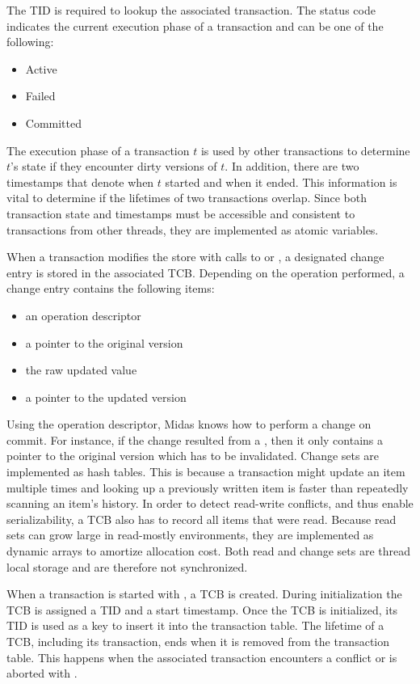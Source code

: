 The TID is required to lookup the associated transaction. The status code indicates the current execution phase of a transaction and can be one of the following:

\begin{itemize}
    \item Active
    \item Failed
    \item Committed
\end{itemize}

The execution phase of a transaction $t$ is used by other transactions to determine $t$'s state if they encounter dirty versions of $t$. In addition, there are two timestamps that denote when $t$ started and when it ended. This information is vital to determine if the lifetimes of two transactions overlap. Since both transaction state and timestamps must be accessible and consistent to transactions from other threads, they are implemented as atomic variables.

When a transaction modifies the store with calls to  or , a designated change entry is stored in the associated TCB. Depending on the operation performed, a change entry contains the following items:

\begin{itemize}
    \item an operation descriptor
    \item a pointer to the original version
    \item the raw updated value
    \item a pointer to the updated version
\end{itemize}

Using the operation descriptor, Midas knows how to perform a change on commit. For instance, if the change resulted from a , then it only contains a pointer to the original version which has to be invalidated. Change sets are implemented as hash tables. This is because a transaction might update an item multiple times and looking up a previously written item is faster than repeatedly scanning an item's history. In order to detect read-write conflicts, and thus enable serializability, a TCB also has to record all items that were read. Because read sets can grow large in read-mostly environments, they are implemented as dynamic arrays to amortize allocation cost. Both read and change sets are thread local storage and are therefore not synchronized.

When a transaction is started with , a TCB is created. During initialization the TCB is assigned a TID and a start timestamp.  Once the TCB is initialized, its TID is used as a key to insert it into the transaction table. The lifetime of a TCB, including its transaction, ends when it is removed from the transaction table. This happens when the associated transaction encounters a conflict or is aborted with .


